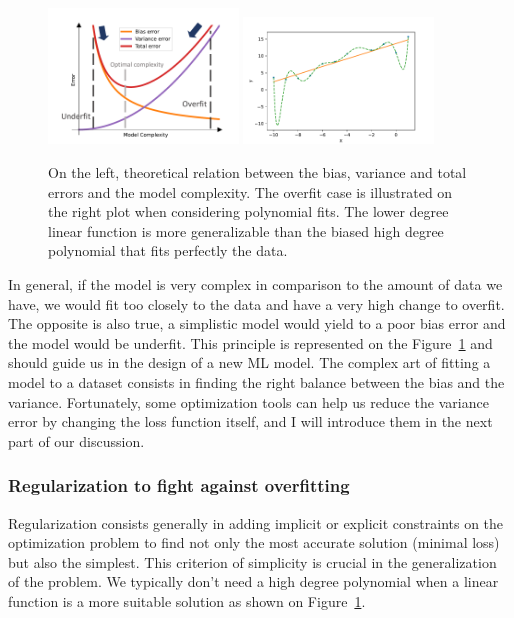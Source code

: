 \documentclass[main]{subfiles}
\begin{document}
\begin{figure}[ht]
  \centering
    \includegraphics[width=0.45\textwidth]{figures/4-ml/Bias_variance_tradeoff.pdf}
    \includegraphics[width=0.45\textwidth]{figures/4-ml/overfit.pdf}
    \caption{On the left, theoretical relation between the bias, variance and total errors and the model complexity. The overfit case is illustrated on the right plot when considering polynomial fits. The lower degree linear function is more generalizable than the biased high degree polynomial that fits perfectly the data.}\label{fgr:bias_variance}
\end{figure}

In general, if the model is very complex in comparison to the amount of data we have, we would fit too closely to the data and have a very high change to overfit. The opposite is also true, a simplistic model would yield to a poor bias error and the model would be underfit. This principle is represented on the Figure~\ref{fgr:bias_variance} and should guide us in the design of a new ML model.
The complex art of fitting a model to a dataset consists in finding the right balance between the bias and the variance. Fortunately, some optimization tools can help us reduce the variance error by changing the loss function itself, and I will introduce them in the next part of our discussion.

\subsubsection{Regularization to fight against overfitting}

Regularization consists generally in adding implicit or explicit constraints on the optimization problem to find not only the most accurate solution (minimal loss) but also the simplest. This criterion of simplicity is crucial in the generalization of the problem. We typically don't need a high degree polynomial when a linear function is a more suitable solution as shown on Figure~\ref{fgr:bias_variance}. 
\end{document}
